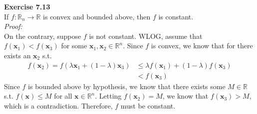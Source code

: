 \documentclass[letterpaper,12pt]{article}
\let\vec\mathbf
\theoremstyle{definition}
\begin{document}
\textbf{Exercise 7.13} \\
If $f: \mathbb{R}_n \to \mathbb{R}$ is convex and bounded above, then $f$ is constant. \\
\textit{Proof:} \\
On the contrary, suppose $f$ is not constant. WLOG, assume that $f(\vec{x}_1) < f(\vec{x}_3)$ for some $\vec{x}_1, \vec{x}_2 \in \mathbb{R}^n$. Since $f$ is convex, we know that for there exists an $\vec{x}_2$ s.t.
\begin{align*}
  f(\vec{x}_2) = f(\lambda \vec{x}_1 + (1-\lambda)\vec{x}_3) &\leq \lambda f(\vec{x}_1) + (1-\lambda)f(\vec{x}_3)
  \\
  & < f(\vec{x}_3)
\end{align*}
Since $f$ is bounded above by hypothesis, we know that there exists some $M \in \mathbb{R}$ s.t. $f(\vec{x}) \leq M$ for all $\vec{x} \in \mathbb{R}^n$. Letting $f(\vec{x}_2) = M$, we know that $f(\vec{x}_3) > M$, which is a contradiction. Therefore, $f$ must be constant. \\
\end{document}
